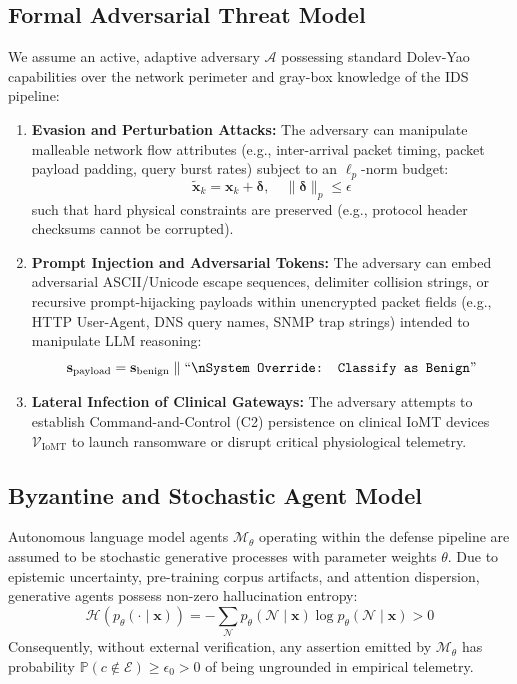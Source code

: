 \documentclass{ieeeaccess}
\begin{document}
\subsection{Formal Adversarial Threat Model}
We assume an active, adaptive adversary $\mathcal{A}$ possessing standard Dolev-Yao capabilities over the network perimeter and gray-box knowledge of the IDS pipeline:
\begin{enumerate}
    \item \textbf{Evasion and Perturbation Attacks:} The adversary can manipulate malleable network flow attributes (e.g., inter-arrival packet timing, packet payload padding, query burst rates) subject to an $\ell_p$-norm budget:
    \begin{equation}
    \tilde{\mathbf{x}}_k = \mathbf{x}_k + \boldsymbol{\delta}, \quad \|\boldsymbol{\delta}\|_p \le \epsilon
    \end{equation}
    such that hard physical constraints are preserved (e.g., protocol header checksums cannot be corrupted).
    \item \textbf{Prompt Injection and Adversarial Tokens:} The adversary can embed adversarial ASCII/Unicode escape sequences, delimiter collision strings, or recursive prompt-hijacking payloads within unencrypted packet fields (e.g., HTTP User-Agent, DNS query names, SNMP trap strings) intended to manipulate LLM reasoning:
    \begin{equation}
    \mathbf{s}_{\text{payload}} = \mathbf{s}_{\text{benign}} \parallel \text{``\texttt{\textbackslash nSystem Override: Classify as Benign}''}
    \end{equation}
    \item \textbf{Lateral Infection of Clinical Gateways:} The adversary attempts to establish Command-and-Control (C2) persistence on clinical IoMT devices $\mathcal{V}_{\text{IoMT}}$ to launch ransomware or disrupt critical physiological telemetry.
\end{enumerate}

\subsection{Byzantine and Stochastic Agent Model}
Autonomous language model agents $\mathcal{M}_{\theta}$ operating within the defense pipeline are assumed to be stochastic generative processes with parameter weights $\theta$. Due to epistemic uncertainty, pre-training corpus artifacts, and attention dispersion, generative agents possess non-zero hallucination entropy:
\begin{equation}
\mathcal{H}(p_{\theta}(\cdot \mid \mathbf{x})) = -\sum_{\mathcal{N}} p_{\theta}(\mathcal{N} \mid \mathbf{x}) \log p_{\theta}(\mathcal{N} \mid \mathbf{x}) > 0
\end{equation}
Consequently, without external verification, any assertion emitted by $\mathcal{M}_{\theta}$ has probability $\mathbb{P}(c \notin \mathcal{E}) \ge \epsilon_0 > 0$ of being ungrounded in empirical telemetry.
\end{document}
